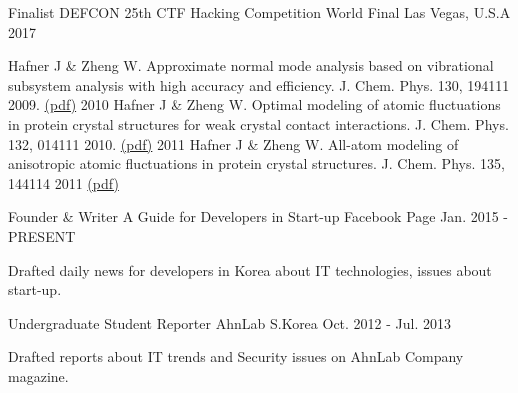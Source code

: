 

\begin{cventries}
  \cvhonor
    {Finalist} %
    {DEFCON 25th CTF Hacking Competition World Final} %
    {Las Vegas, U.S.A} %
    {2017} %

	\cvhonor
     {Hafner J \& Zheng W. Approximate normal mode analysis based on vibrational subsystem analysis with high accuracy and efficiency. J. Chem. Phys. 130, 194111 2009.  \href{http://www.acsu.buffalo.edu/~wjzheng/Hafner_jcp2009.pdf}{(pdf)}}
  \twentyitemshort
     {2010}
     {Hafner J \& Zheng W. Optimal modeling of atomic fluctuations in protein crystal structures for weak crystal contact interactions. J. Chem. Phys. 132, 014111 2010. \href{http://www.acsu.buffalo.edu/~wjzheng/Hafner_jcp2010.pdf}{(pdf)}}
  \twentyitemshort
     {2011}
     {Hafner J \& Zheng W. All-atom modeling of anisotropic atomic fluctuations in protein crystal structures. J. Chem. Phys. 135, 144114 2011 \href{http://www.acsu.buffalo.edu/\~{}wjzheng/Hafner_jcp2011.pdf}{(pdf)}}

  \cventry
    {Founder \& Writer} %
    {A Guide for Developers in Start-up} %
    {Facebook Page} %
    {Jan. 2015 - PRESENT} %
    {
      \begin{cvitems} %
        \item {Drafted daily news for developers in Korea about IT technologies, issues about start-up.}
      \end{cvitems}
    }

  \cventry
    {Undergraduate Student Reporter} %
    {AhnLab} %
    {S.Korea} %
    {Oct. 2012 - Jul. 2013} %
    {
      \begin{cvitems} %
        \item {Drafted reports about IT trends and Security issues on AhnLab Company magazine.}
      \end{cvitems}
    }

\end{cventries}
